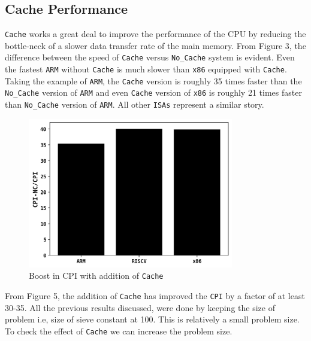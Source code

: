 \subsection{Cache Performance}
\texttt{Cache} works a great deal to improve the performance of the CPU by reducing the bottle-neck of
a slower data transfer rate of the main memory. From Figure 3, the difference between the speed of \texttt{Cache}
versus \texttt{No\_Cache} system is evident. Even the fastest \texttt{ARM} without \texttt{Cache} is much slower than 
\texttt{x86} equipped with \texttt{Cache}. Taking the example of \texttt{ARM}, the \texttt{Cache} version
is roughly 35 times faster than the \texttt{No\_Cache} version of \texttt{ARM} and even \texttt{Cache} version of \texttt{x86}
is roughly 21 times faster than \texttt{No\_Cache} version of \texttt{ARM}. All other \texttt{ISAs} represent a similar
story.
\begin{figure}[H]
    \centering
    \includegraphics[width=0.8\textwidth]{./figs/5.png}
    \caption{Boost in CPI with addition of \texttt{Cache}}
    \label{fig:Boost in CPI with addition of \texttt{Cache}}
\end{figure}
From Figure 5, the addition of \texttt{Cache} has improved the \texttt{CPI} by a factor of at least 30-35.
All the previous results discussed, were done by keeping the size of problem i.e, size of sieve constant at
100. This is relatively a small problem size. To check the effect of \texttt{Cache} we can increase the problem size.
